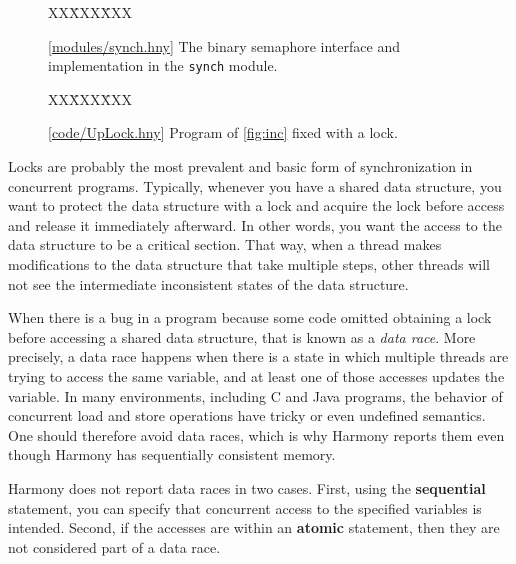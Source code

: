 \documentclass{report}
\newcommand{\harmonysource}[1]{
\begin{tabbing}
XX\=XXX\=XXX\kill
    
\end{tabbing}
}
\newcommand{\harmonylink}[1]{%
[\href{https://harmony.cs.cornell.edu/#1}{\underline{#1}}]%
}
\newenvironment{code}{
\tcolorbox
}{
\endtcolorbox
}
\begin{document}
\begin{figure}
\begin{code}
\harmonysource{lockintf}
\end{code}
\caption{\harmonylink{modules/synch.hny} The binary semaphore interface and implementation in the \texttt{synch} module.}
\label{fig:spinlocks}
\end{figure}

\begin{figure}
\begin{code}
\harmonysource{UpLock}
\end{code}
\caption{\harmonylink{code/UpLock.hny} Program of \autoref{fig:inc} fixed with a lock.}
\label{fig:incfixed}
\end{figure}

Locks are probably the most prevalent and basic form of synchronization
in concurrent programs.  Typically, whenever you have a shared data
structure, you want to protect the data structure with a lock and
acquire the lock before access and release it immediately afterward.
In other words, you want the access to the data structure to be a
critical section.
That way, when a thread makes modifications to the data structure that take
multiple steps, other threads will not see the intermediate inconsistent
states of the data structure.

%
%
When there is a bug in a program because some code omitted obtaining
a lock before accessing a shared data structure, that is known as a
\emph{data race}.
More precisely, a data race happens when there is a state in which multiple
threads are trying to access the same variable, and at least one of those
accesses updates the variable.
In many environments, including C and Java programs, the behavior of
concurrent load and store operations have tricky or even undefined
semantics.  One should therefore avoid data races, which is why Harmony
reports them even though Harmony has sequentially consistent memory.

Harmony does not report data races in two cases.
First, using the \textbf{sequential} statement, you can specify that
concurrent access to the specified variables is intended.
Second, if the accesses are within an \textbf{atomic} statement, then they
are not considered part of a data race.

\end{document}
